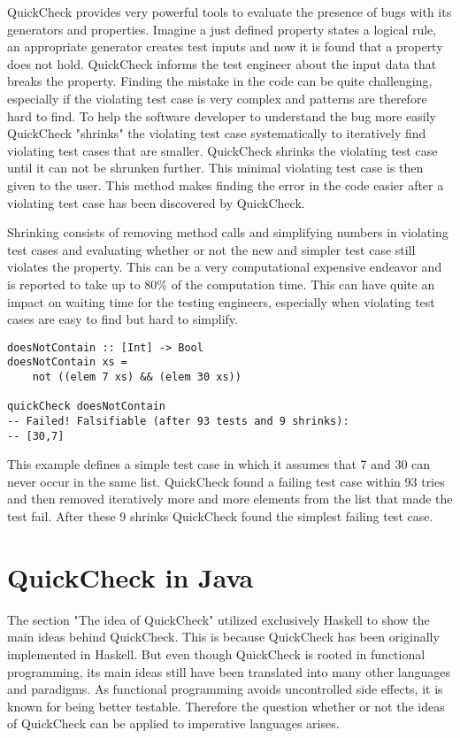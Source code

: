 \documentclass[a4paper, 12pt]{article} %
\begin{document}
QuickCheck provides very powerful tools to evaluate the presence of bugs with its generators and properties. Imagine a just defined property states a logical rule, an appropriate generator creates test inputs and now it is found that a property does not hold. QuickCheck informs the test engineer about the input data that breaks the property. Finding the mistake in the code can be quite challenging, especially if the violating test case is very complex and patterns are therefore hard to find. To help the software developer to understand the bug more easily QuickCheck "shrinks" the violating test case systematically to iteratively find violating test cases that are smaller. QuickCheck shrinks the violating test case until it can not be shrunken further. This minimal violating test case is then given to the user. This method makes finding the error in the code easier after a violating test case has been discovered by QuickCheck. \cite{Claessen2009}

Shrinking consists of removing method calls and simplifying numbers in violating test cases and evaluating whether or not the new and simpler test case still violates the property. This can be a very computational expensive endeavor and is reported to take up to 80\% of the computation time. This can have quite an impact on waiting time for the testing engineers, especially when violating test cases are easy to find but hard to simplify. \cite{Hughes:2016}

\begin{verbatim}
doesNotContain :: [Int] -> Bool
doesNotContain xs = 
    not ((elem 7 xs) && (elem 30 xs))

quickCheck doesNotContain
-- Failed! Falsifiable (after 93 tests and 9 shrinks):
-- [30,7]
\end{verbatim}

This example defines a simple test case in which it assumes that 7 and 30 can never occur in the same list. QuickCheck found a failing test case within 93 tries and then removed iteratively more and more elements from the list that made the test fail. After these 9 shrinks QuickCheck found the simplest failing test case.

\newpage
\section{QuickCheck in Java}

The section "The idea of QuickCheck" utilized exclusively Haskell to show the main ideas behind QuickCheck. This is because QuickCheck has been originally implemented in Haskell. But even though QuickCheck is rooted in functional programming, its main ideas still have been translated into many other languages and paradigms. As functional programming avoids uncontrolled side effects, it is known for being better testable. Therefore the question whether or not the ideas of QuickCheck can be applied to imperative languages arises. 
\end{document}

